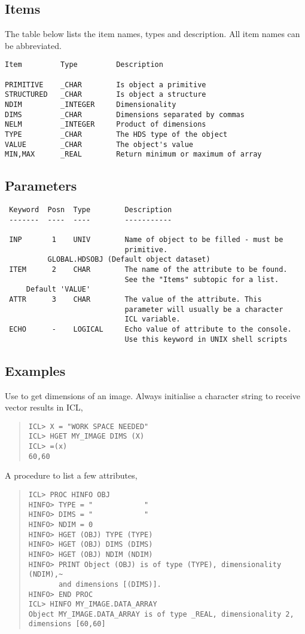 \documentclass{book}
\renewcommand{\_}{{\tt\char'137}}     %
\begin{document}
\subsection{Items}
The table below lists the item names, types and description. All item
names can be abbreviated.

\begin{verbatim}
Item         Type         Description

PRIMITIVE    _CHAR        Is object a primitive
STRUCTURED   _CHAR        Is object a structure
NDIM         _INTEGER     Dimensionality
DIMS         _CHAR        Dimensions separated by commas
NELM         _INTEGER     Product of dimensions
TYPE         _CHAR        The HDS type of the object
VALUE        _CHAR        The object's value
MIN,MAX      _REAL        Return minimum or maximum of array
\end{verbatim}
\subsection{Parameters}
\begin{verbatim}
 Keyword  Posn  Type        Description
 -------  ----  ----        -----------

 INP       1    UNIV        Name of object to be filled - must be
                            primitive.
          GLOBAL.HDSOBJ (Default object dataset)
 ITEM      2    CHAR        The name of the attribute to be found.
                            See the "Items" subtopic for a list.
     Default 'VALUE'
 ATTR      3    CHAR        The value of the attribute. This
                            parameter will usually be a character
                            ICL variable.
 ECHO      -    LOGICAL     Echo value of attribute to the console.
                            Use this keyword in UNIX shell scripts

\end{verbatim}\subsection{Examples}
Use to get dimensions of an image. Always initialise a character
string to receive vector results in ICL,
\begin{quote}\begin{verbatim}
ICL> X = "WORK SPACE NEEDED"
ICL> HGET MY_IMAGE DIMS (X)
ICL> =(x)
60,60
\end{verbatim}\end{quote}
A procedure to list a few attributes,
\begin{quote}\begin{verbatim}
ICL> PROC HINFO OBJ
HINFO> TYPE = "            "
HINFO> DIMS = "            "
HINFO> NDIM = 0
HINFO> HGET (OBJ) TYPE (TYPE)
HINFO> HGET (OBJ) DIMS (DIMS)
HINFO> HGET (OBJ) NDIM (NDIM)
HINFO> PRINT Object (OBJ) is of type (TYPE), dimensionality (NDIM),~
       and dimensions [(DIMS)].
HINFO> END PROC
ICL> HINFO MY_IMAGE.DATA_ARRAY
Object MY_IMAGE.DATA_ARRAY is of type _REAL, dimensionality 2, dimensions [60,60]
\end{verbatim}\end{quote}
\end{document}
